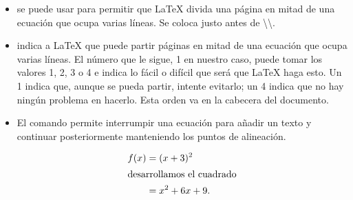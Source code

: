 \documentclass{article}
\numberwithin{equation}{section}
\theoremstyle{plain}
\theoremstyle{definition}
\theoremstyle{remark}
\begin{document}
\begin{itemize}
	\item \texttt{\displaybreak} se puede usar para permitir que \LaTeX{} divida una página en mitad de una ecuación que ocupa varias líneas. Se coloca justo antes de \textbackslash\textbackslash.
	\item \texttt{\allowdisplaybreaks[1]} indica a \LaTeX{} que puede partir páginas en mitad de una ecuación que ocupa varias líneas. El número que le sigue, 1 en nuestro caso, puede tomar los valores 1, 2, 3 o 4 e indica lo fácil o difícil que será que \LaTeX{} haga esto. Un 1 indica que, aunque se pueda partir, intente evitarlo; un 4 indica que no hay ningún problema en hacerlo. Esta orden va en la cabecera del documento.
	\item El comando \texttt{\intertext} permite interrumpir una ecuación para añadir un texto y continuar posteriormente manteniendo los puntos de alineación.
		\begin{codigo-arriba}
			\begin{equation*}
				\begin{split}
					f(x) & = (x+3)^2 \\
					\intertext{desarrollamos el cuadrado} 
						 & = x^2+6x+9.
				\end{split}			
			\end{equation*}
		\end{codigo-arriba}


\end{itemize}
\end{document}
